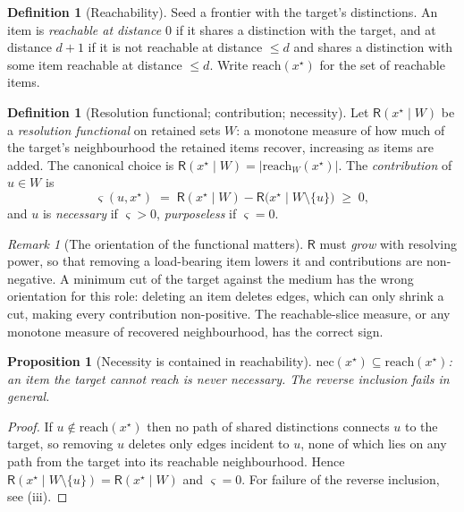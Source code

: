 \documentclass[11pt,twocolumn,a4paper]{article}
\theoremstyle{dirthm}
\newtheorem{proposition}[theorem]{Proposition}
\theoremstyle{definition}
\newtheorem{definition}[theorem]{Definition}
\theoremstyle{remark}
\newtheorem{remark}[theorem]{Remark}
\newcommand{\reach}{\mathrm{reach}}
\newcommand{\nec}{\mathrm{nec}}
\newcommand{\Res}{\mathsf{R}}
\newcommand{\abs}[1]{\lvert#1\rvert}
\newcommand{\set}[1]{\{#1\}}
\begin{document}
\begin{definition}[Reachability]
\label{def:reach}
Seed a frontier with the target's distinctions. An item is \emph{reachable at
distance $0$} if it shares a distinction with the target, and at distance
$d+1$ if it is not reachable at distance $\le d$ and shares a distinction with
some item reachable at distance $\le d$. Write $\reach(x^{\star})$ for the set
of reachable items.
\end{definition}

\begin{definition}[Resolution functional; contribution; necessity]
\label{def:contribution}
Let $\Res(x^{\star}\mid W)$ be a \emph{resolution functional} on retained sets
$W$: a monotone measure of how much of the target's neighbourhood the retained
items recover, increasing as items are added. The canonical choice is
$\Res(x^{\star}\mid W)=\abs{\reach_W(x^{\star})}$. The \emph{contribution} of
$u\in W$ is
\[
\varsigma(u,x^{\star})\;=\;\Res(x^{\star}\mid W)-\Res\bigl(x^{\star}\mid W\setminus\set u\bigr)\;\ge\;0,
\]
and $u$ is \emph{necessary} if $\varsigma>0$, \emph{purposeless} if
$\varsigma=0$.
\end{definition}

\begin{remark}[The orientation of the functional matters]
\label{rem:orientation}
$\Res$ must \emph{grow} with resolving power, so that removing a load-bearing
item lowers it and contributions are non-negative. A minimum cut of the target
against the medium has the wrong orientation for this role: deleting an item
deletes edges, which can only shrink a cut, making every contribution
non-positive. The reachable-slice measure, or any monotone measure of
recovered neighbourhood, has the correct sign.
\end{remark}

\begin{proposition}[Necessity is contained in reachability]
\label{prop:nec-subset}
$\nec(x^{\star})\subseteq\reach(x^{\star})$: an item the target cannot reach
is never necessary. The reverse inclusion fails in general.
\end{proposition}

\begin{proof}
If $u\notin\reach(x^{\star})$ then no path of shared distinctions connects $u$
to the target, so removing $u$ deletes only edges incident to $u$, none of
which lies on any path from the target into its reachable neighbourhood.
Hence $\Res(x^{\star}\mid W\setminus\set u)=\Res(x^{\star}\mid W)$ and
$\varsigma=0$. For failure of the reverse inclusion, see
(iii).
\end{proof}
\end{document}
